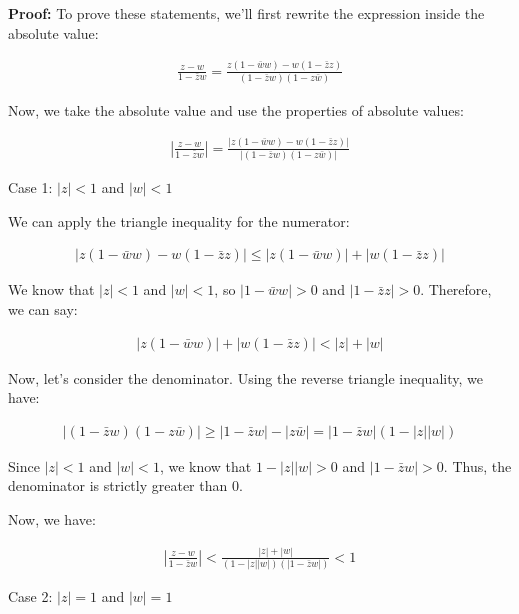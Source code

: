 \begin{enumerate}
	      \textbf{Proof:}
	      To prove these statements, we'll first rewrite the expression inside the absolute value:

	      \begin{align*}
		      \frac{z - w}{1 - \bar{z}w} = \frac{z(1 - \bar{w}w) - w(1 - \bar{z}z)}{(1 - \bar{z}w)(1 - z\bar{w})}
	      \end{align*}

	      Now, we take the absolute value and use the properties of absolute values:

	      \begin{align*}
		      \left|\frac{z - w}{1 - \bar{z}w}\right|
		      = \frac{|z(1 - \bar{w}w) - w(1 - \bar{z}z)|}{|(1 - \bar{z}w)(1 - z\bar{w})|}
	      \end{align*}

	      Case 1: $|z| < 1$ and $|w| < 1$

	      We can apply the triangle inequality for the numerator:

	      \begin{align*}
		      |z(1 - \bar{w}w) - w(1 - \bar{z}z)| \le |z(1 - \bar{w}w)| + |w(1 - \bar{z}z)|
	      \end{align*}

	      We know that $|z| < 1$ and $|w| < 1$, so $|1 - \bar{w}w| > 0$ and $|1 - \bar{z}z| > 0$. Therefore,
	      we can say:

	      \begin{align*}
		      |z(1 - \bar{w}w)| + |w(1 - \bar{z}z)| < |z| + |w|
	      \end{align*}

	      Now, let's consider the denominator. Using the reverse triangle inequality, we have:

	      \begin{align*}
		      |(1 - \bar{z}w)(1 - z\bar{w})| \ge |1 - \bar{z}w| - |z\bar{w}| = |1 - \bar{z}w|(1 - |z||w|)
	      \end{align*}

	      Since $|z| < 1$ and $|w| < 1$, we know that $1 - |z||w| > 0$ and $|1 - \bar{z}w| > 0$. Thus,
	      the denominator is strictly greater than 0.

	      Now, we have:

	      \begin{align*}
		      \left|\frac{z - w}{1 - \bar{z}w}\right| < \frac{|z| + |w|}{(1 - |z||w|)(|1 - \bar{z}w|)} < 1
	      \end{align*}

	      Case 2: $|z| = 1$ and $|w| = 1$


\end{enumerate}
